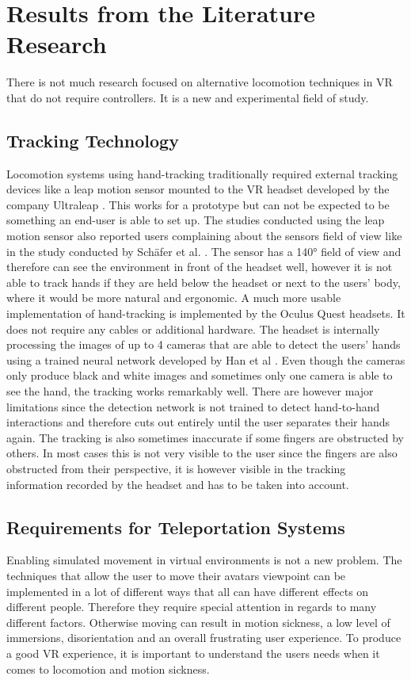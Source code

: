 \chapter{Results from the Literature Research}

There is not much research focused on alternative locomotion techniques in VR that do not require controllers. It is a new and experimental field of study.

\section{Tracking Technology}
Locomotion systems using hand-tracking traditionally required external tracking devices like a leap motion sensor mounted to the VR headset developed by the company Ultraleap \cite{Ultraleap}.
This works for a prototype but can not be expected to be something an end-user is able to set up. The studies conducted using the leap motion sensor also reported users complaining about the sensors field of view like in the study conducted by Schäfer et al. \cite{Schafer2021}.
The sensor has a 140° field of view and therefore can see the environment in front of the headset well, however it is not able to track hands if they are held below the headset or next to the users' body, where it would be more natural and ergonomic. A much more usable implementation of hand-tracking is implemented by the Oculus Quest headsets. It does not require any cables or additional hardware. The headset is internally processing the images of up to 4 cameras that are able to detect the users' hands using a trained neural network developed by Han et al \cite{Han}.
Even though the cameras only produce black and white images and sometimes only one camera is able to see the hand, the tracking works remarkably well. There are however major limitations since the detection network is not trained to detect hand-to-hand interactions and therefore cuts out entirely until the user separates their hands again. The tracking is also sometimes inaccurate if some fingers are obstructed by others. In most cases this is not very visible to the user since the fingers are also obstructed from their perspective, it is however visible in the tracking information recorded by the headset and has to be taken into account. 

\section{Requirements for Teleportation Systems}
Enabling simulated movement in virtual environments is not a new problem. The techniques that allow the user to move their avatars viewpoint can be implemented in a lot of different ways that all can have different effects on different people. Therefore they require special attention in regards to many different factors. Otherwise moving can result in motion sickness, a low level of immersions, disorientation and an overall frustrating user experience. To produce a good VR experience, it is important to understand the users needs when it comes to locomotion and motion sickness. 

